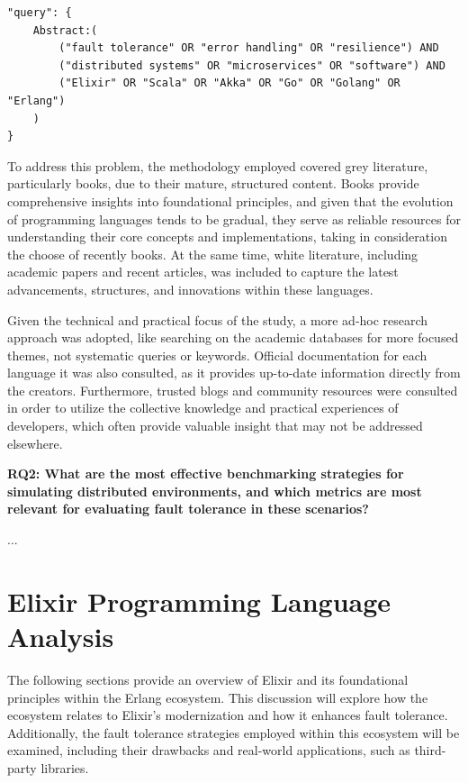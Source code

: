\begin{verbatim}
"query": { 
    Abstract:(
        ("fault tolerance" OR "error handling" OR "resilience") AND
        ("distributed systems" OR "microservices" OR "software") AND 
        ("Elixir" OR "Scala" OR "Akka" OR "Go" OR "Golang" OR "Erlang")
    )
}
\end{verbatim}

To address this problem, the methodology employed covered grey literature, particularly books, due to their mature, structured content. Books provide comprehensive insights into foundational principles, and given that the evolution of programming languages tends to be gradual, they serve as reliable resources for understanding their core concepts and implementations, taking in consideration the choose of recently books. At the same time, white literature, including academic papers and recent articles, was included to capture the latest advancements, structures, and innovations within these languages.

Given the technical and practical focus of the study, a more ad-hoc research approach was adopted, like searching on the academic databases for more focused themes, not systematic queries or keywords. Official documentation for each language it was also consulted, as it provides up-to-date information directly from the creators. Furthermore, trusted blogs and community resources were consulted in order to utilize the collective knowledge and practical experiences of developers, which often provide valuable insight that may not be addressed elsewhere.

\textbf{RQ2: What are the most effective benchmarking strategies for simulating distributed environments, and which metrics are most relevant for evaluating fault tolerance in these scenarios?}

...

\section{Elixir Programming Language Analysis}

The following sections provide an overview of Elixir and its foundational principles within the Erlang ecosystem. This discussion will explore how the ecosystem relates to Elixir's modernization and how it enhances fault tolerance. Additionally, the fault tolerance strategies employed within this ecosystem will be examined, including their drawbacks and real-world applications, such as third-party libraries.

